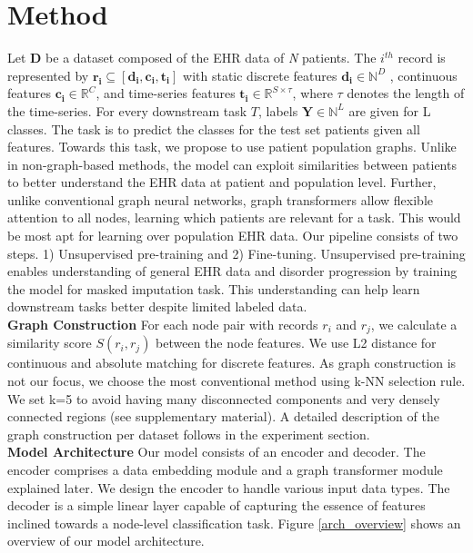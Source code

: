 \documentclass[runningheads]{llncs}
\begin{document}
 \section{Method}
Let $\mathbf{D}$ be a dataset composed of the EHR data of \textit{N} patients. The $i^{th}$ record is represented by $\mathbf{r_i} \subseteq [\mathbf{d_i},\mathbf{c_i},\mathbf{t_i}]$ with static discrete features $\mathbf{d_i} \in \mathbb{N}^D$ , continuous features $\mathbf{c_i} \in \mathbb{R}^C$, and time-series features  $\mathbf{t_i} \in \mathbb{R}^{S \times \tau }$, where $\tau $ denotes the length of the time-series.
For every downstream task $T$, labels $\mathbf{Y} \in \mathbb{N}^L$ are given for L classes. The task is to predict the classes for the test set patients given all features. Towards this task, we propose to use patient population graphs. 
Unlike in non-graph-based methods, the model can exploit similarities between patients to better understand the EHR data at patient and population level.
Further, unlike conventional graph neural networks, graph transformers allow flexible attention to all nodes, learning which patients are relevant for a task. This would be most apt for learning over population EHR data.
Our pipeline consists of two steps. 1) Unsupervised pre-training and 2) Fine-tuning. Unsupervised pre-training enables understanding of general EHR data and disorder progression by training the model for masked imputation task. This understanding can help learn downstream tasks better despite limited labeled data.\\
\textbf{Graph Construction}
For each node pair with records $r_i$ and $r_j$, we calculate a similarity score $S(r_i, r_j)$ between the node features. We use L2 distance for continuous and absolute matching for discrete features. As graph construction is not our focus, we choose the most conventional method using k-NN selection rule. We set k=5 to avoid having many disconnected components and very densely connected regions (see supplementary material). A detailed description of the graph construction per dataset follows in the experiment section.\\
\textbf{Model Architecture}
Our model consists of an encoder and decoder. The encoder comprises a data embedding module and a graph transformer module explained later. We design the encoder to handle various input data types. The decoder is a simple linear layer capable of capturing the essence of features inclined towards a node-level classification task. Figure \ref{arch_overview} shows an overview of our model architecture.\\
\end{document}
